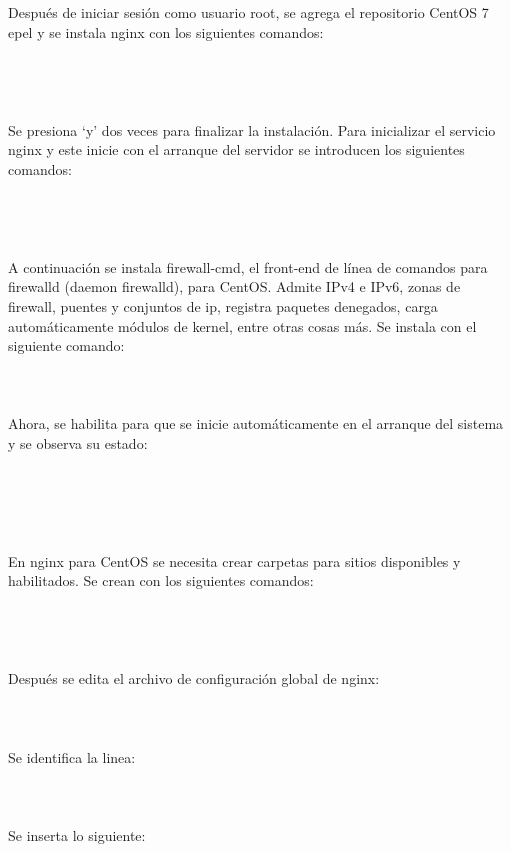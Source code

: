 Después de iniciar sesión como usuario root, se agrega el repositorio CentOS 7 \acrshort{epel} y se instala nginx con los siguientes comandos:\\
\\
\\
\\
\\
Se presiona ‘y’ dos veces para finalizar la instalación. Para inicializar el servicio nginx y este inicie con el arranque del servidor se introducen los siguientes comandos:\\
\\
\\
\\
\\
A continuación se instala firewall-cmd, el front-end de línea de comandos para firewalld (\gls{daemon} firewalld), para CentOS. Admite IPv4 e IPv6, zonas de firewall, puentes y conjuntos de ip, registra paquetes denegados, carga automáticamente módulos de \gls{kernel}, entre otras cosas más. Se instala con el siguiente comando:\\
\\
\\
\\
Ahora, se habilita para que se inicie automáticamente en el arranque del sistema y se observa su estado:\\
\\
\\
\\
\\
\\
En nginx para CentOS se necesita crear carpetas para sitios disponibles y habilitados. Se crean con los siguientes comandos:\\
\\
\\
\\
\\
Después se edita el archivo de configuración global de nginx:\\
\\
\\
\\
Se identifica la linea:\\
\\
\\
\\
Se inserta lo siguiente:\\
\\
\\
\vspace{0.8cm}

